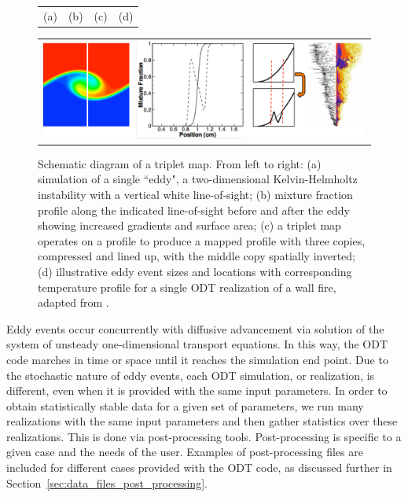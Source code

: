 \documentclass[preprint,12pt, a4paper]{elsarticle}
\begin{document}
\begin{figure}
		\begin{tabular}{llll}
			\hspace{40pt}(a) & \hspace{100pt} (b) & \hspace{70pt} (c) & \hspace{50pt}(d) 
		\end{tabular}
	\begin{center}
		\begin{tabular}{c}
            \includegraphics[width=\textwidth]{fig_tripmap.pdf} 
		\end{tabular}
	\end{center}
    \caption{Schematic diagram of a triplet map. From left to right: (a) simulation of a single ``eddy", a two-dimensional Kelvin-Helmholtz instability with a vertical white line-of-sight; (b) mixture fraction profile along the indicated line-of-sight before and after the eddy showing increased gradients and surface area; (c) a triplet map operates on a profile to produce a mapped profile with three copies, compressed and lined up, with the middle copy spatially inverted; (d) illustrative eddy event sizes and locations with corresponding temperature profile for a single ODT realization of a wall fire, adapted from \cite{Monson_2016}.}
\label{fig:tripletmap}
\end{figure}

Eddy events occur concurrently with diffusive advancement via solution of the system of unsteady one-dimensional transport equations. In this way, the ODT code marches in time or space until it reaches the simulation end point. Due to the stochastic nature of eddy events, each ODT simulation, or realization, is different, even when it is provided with the same input parameters. In order to obtain statistically stable data for a given set of parameters, we run many realizations with the same input parameters and then gather statistics over these realizations. This is done via post-processing tools. Post-processing is specific to a given case and the needs of the user. Examples of post-processing files are included for different cases provided with the ODT code, as discussed further in Section~\ref{sec:data_files_post_processing}.
\end{document}
